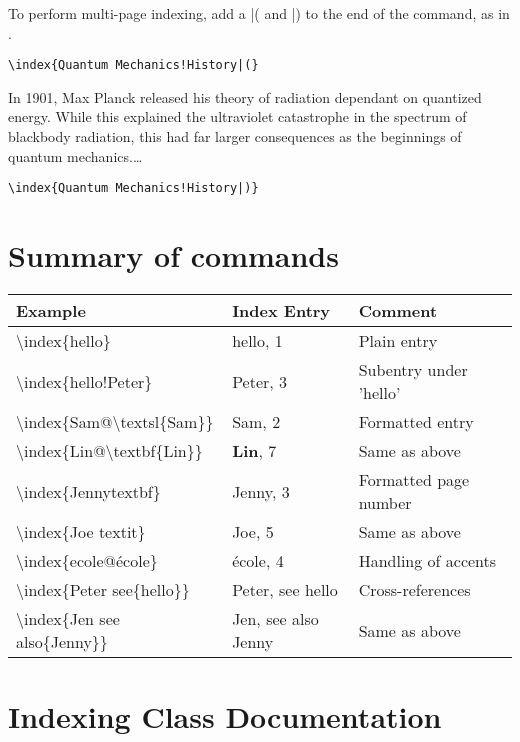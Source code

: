 \begin{multicols}{2}
To perform multi-page indexing, add a |( and |) to the end of the \cmd{\index} command, as in 
.

{\small
\verb+\index{Quantum Mechanics!History|(}+

\narrower\narrower
In 1901, Max Planck released his theory of radiation dependant 
on quantized energy. While this explained the ultraviolet catastrophe
 in the spectrum of blackbody radiation, this had far larger consequences 
as the beginnings of quantum mechanics.\ldots

\verb+\index{Quantum Mechanics!History|)}+
}

\end{multicols}



\section{Summary of commands}

\begin{tabular}{lll}
\toprule
Example	&Index Entry	&Comment\\
\midrule
\textbackslash index\{hello\}	          &hello, 1	&Plain entry\\
\textbackslash index\{hello!Peter\}	      &Peter, 3	&Subentry under 'hello'\\
\textbackslash index\{Sam@\textbackslash textsl\{Sam\}\}	&Sam, 2	&Formatted entry\\
\textbackslash index\{Lin@\textbackslash textbf\{Lin\}\}	&\textbf{Lin}, 7	&Same as above\\
\textbackslash index\{Jennytextbf\}	     &Jenny, 3	&Formatted page number\\
\textbackslash index\{Joe textit\}	&Joe, 5	          &Same as above\\
\textbackslash index\{ecole@\'ecole\}	&école, 4	&Handling of accents\\
\textbackslash index\{Peter see\{hello\}\}	&Peter, see hello	&Cross-references\\
\textbackslash index\{Jen see also\{Jenny\}\}	&Jen, see also Jenny	 &Same as above\\
\bottomrule
\end{tabular}

\section{Indexing Class Documentation}

